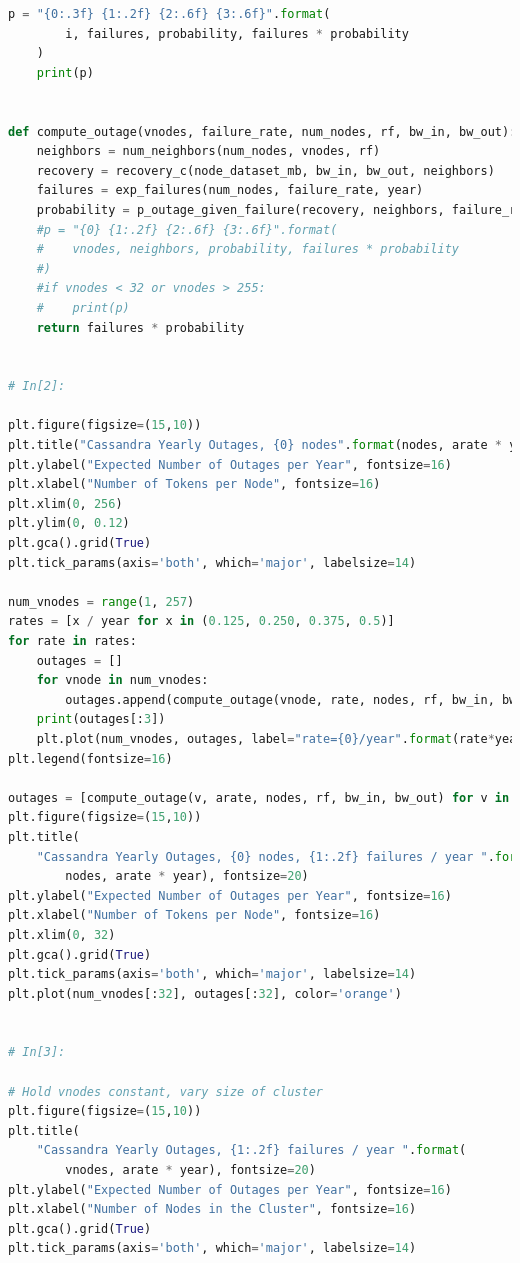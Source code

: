 \documentclass{article}
\begin{document}
\begin{lstlisting}[language=Python]
    p = "{0:.3f} {1:.2f} {2:.6f} {3:.6f}".format(
        i, failures, probability, failures * probability
    )
    print(p)


def compute_outage(vnodes, failure_rate, num_nodes, rf, bw_in, bw_out):
    neighbors = num_neighbors(num_nodes, vnodes, rf)
    recovery = recovery_c(node_dataset_mb, bw_in, bw_out, neighbors)
    failures = exp_failures(num_nodes, failure_rate, year)
    probability = p_outage_given_failure(recovery, neighbors, failure_rate)
    #p = "{0} {1:.2f} {2:.6f} {3:.6f}".format(
    #    vnodes, neighbors, probability, failures * probability
    #)
    #if vnodes < 32 or vnodes > 255:
    #    print(p)
    return failures * probability


# In[2]:

plt.figure(figsize=(15,10))
plt.title("Cassandra Yearly Outages, {0} nodes".format(nodes, arate * year), fontsize=20)
plt.ylabel("Expected Number of Outages per Year", fontsize=16)
plt.xlabel("Number of Tokens per Node", fontsize=16)
plt.xlim(0, 256)
plt.ylim(0, 0.12)
plt.gca().grid(True)
plt.tick_params(axis='both', which='major', labelsize=14)

num_vnodes = range(1, 257)
rates = [x / year for x in (0.125, 0.250, 0.375, 0.5)]
for rate in rates:
    outages = []
    for vnode in num_vnodes:
        outages.append(compute_outage(vnode, rate, nodes, rf, bw_in, bw_out))
    print(outages[:3])
    plt.plot(num_vnodes, outages, label="rate={0}/year".format(rate*year))
plt.legend(fontsize=16)

outages = [compute_outage(v, arate, nodes, rf, bw_in, bw_out) for v in num_vnodes]
plt.figure(figsize=(15,10))
plt.title(
    "Cassandra Yearly Outages, {0} nodes, {1:.2f} failures / year ".format(
        nodes, arate * year), fontsize=20)
plt.ylabel("Expected Number of Outages per Year", fontsize=16)
plt.xlabel("Number of Tokens per Node", fontsize=16)
plt.xlim(0, 32)
plt.gca().grid(True)
plt.tick_params(axis='both', which='major', labelsize=14)
plt.plot(num_vnodes[:32], outages[:32], color='orange')


# In[3]:

# Hold vnodes constant, vary size of cluster
plt.figure(figsize=(15,10))
plt.title(
    "Cassandra Yearly Outages, {1:.2f} failures / year ".format(
        vnodes, arate * year), fontsize=20)
plt.ylabel("Expected Number of Outages per Year", fontsize=16)
plt.xlabel("Number of Nodes in the Cluster", fontsize=16)
plt.gca().grid(True)
plt.tick_params(axis='both', which='major', labelsize=14)


\end{lstlisting}
\end{document}
